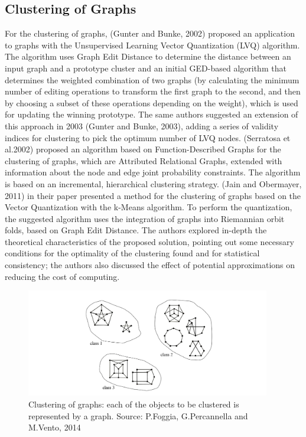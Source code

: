 \subsection{Clustering of Graphs}
For the clustering of graphs, (Gunter and Bunke, 2002) proposed an application to graphs with the Unsupervised Learning Vector Quantization (LVQ) algorithm. The algorithm uses Graph Edit Distance to determine the distance between an input graph and a prototype cluster and an initial GED-based algorithm that determines the weighted combination of two graphs (by calculating the minimum number of editing operations to transform the first graph to the second, and then by choosing a subset of these operations depending on the weight), which is used for updating the winning prototype. The same authors suggested an extension of this approach in 2003 (Gunter and Bunke, 2003), adding a series of validity indices for clustering to pick the optimum number of LVQ nodes. (Serratosa et al.2002) proposed an algorithm based on Function-Described Graphs for the clustering of graphs, which are Attributed Relational Graphs, extended with information about the node and edge joint probability constraints. The algorithm is based on an incremental, hierarchical clustering strategy. (Jain and Obermayer, 2011) in their paper presented a method for the clustering of graphs based on the Vector Quantization with the k-Means algorithm. To perform the quantization, the suggested algorithm uses the integration of graphs into Riemannian orbit folds, based on Graph Edit Distance. The authors explored in-depth the theoretical characteristics of the proposed solution, pointing out some necessary conditions for the optimality of the clustering found and for statistical consistency; the authors also discussed the effect of potential approximations on reducing the cost of computing.

\begin{figure}[h]
\centering
\includegraphics[width=0.95\textwidth,center]{picture/figure6.png}
\caption[Clustering of Graphs]{Clustering of graphs: each of the objects to be clustered is represented by a graph. Source: P.Foggia, G.Percannella and M.Vento, 2014}
\label{fig:clusteringgraphs}
\end{figure}


